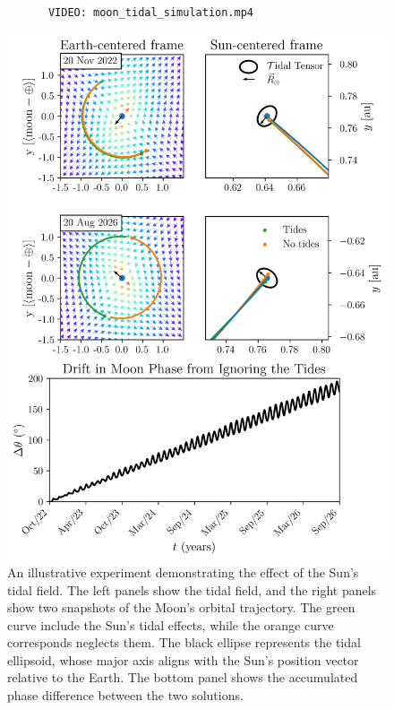             \begin{verbatim}
            VIDEO: moon_tidal_simulation.mp4
            \end{verbatim}

            \begin{figure}
                \centering
                \includegraphics[width=\linewidth]{images/moon_tidal_simulation.png}
                \caption{An illustrative experiment demonstrating the effect of the Sun's tidal field. The left panels show the tidal field, and the right panels show two snapshots of the Moon's orbital trajectory. The green curve include the Sun's tidal effects, while the orange curve corresponds neglects them. The black ellipse represents the tidal ellipsoid, whose major axis aligns with the Sun's position vector relative to the Earth. The bottom panel shows the accumulated phase difference between the two solutions. }\label{fig:moon_tidal_simulation}
            \end{figure}

